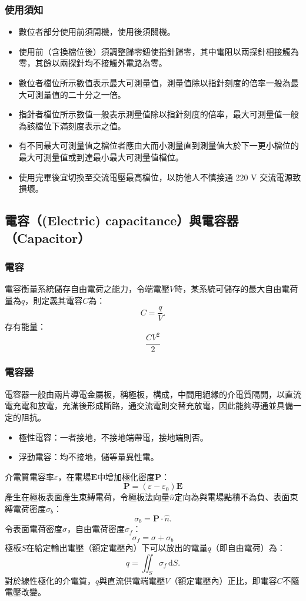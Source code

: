\documentclass[a4paper,12pt]{report}
\begin{document}
\begin{itemize}
\subsubsection{使用須知}
\begin{itemize}
\item 數位者部分使用前須開機，使用後須關機。
\item 使用前（含換檔位後）須調整歸零鈕使指針歸零，其中電阻以兩探針相接觸為零，其餘以兩探針均不接觸外電路為零。
\item 數位者檔位所示數值表示最大可測量值，測量值除以指針刻度的倍率一般為最大可測量值的二十分之一倍。
\item 指針者檔位所示數值一般表示測量值除以指針刻度的倍率，最大可測量值一般為該檔位下滿刻度表示之值。
\item 有不同最大可測量值之檔位者應由大而小測量直到測量值大於下一更小檔位的最大可測量值或到達最小最大可測量值檔位。
\item 使用完畢後宜切換至交流電壓最高檔位，以防他人不慎接通 220 V 交流電源致損壞。
\end{itemize}
\subsection{電容（(Electric) capacitance）與電容器（Capacitor）}
\subsubsection{電容}
電容衡量系統儲存自由電荷之能力，令端電壓$V$時，某系統可儲存的最大自由電荷量為$q$，則定義其電容$C$為：
\[C=\frac{q}{V}.\]
存有能量：
\[\frac{CV^2}{2}\]
\subsubsection{電容器}
電容器一般由兩片導電金屬板，稱極板，構成，中間用絕緣的介電質隔開，以直流電充電和放電，充滿後形成斷路，通交流電則交替充放電，因此能夠導通並具備一定的阻抗。
\begin{itemize}
\item 極性電容：一者接地，不接地端帶電，接地端則否。
\item 浮動電容：均不接地，儲等量異性電。
\end{itemize}
介電質電容率$\varepsilon$，在電場$\mathbf{E}$中增加極化密度$\mathbf{P}$：
\[\mathbf{P}=(\varepsilon-\varepsilon_0)\mathbf{E}\]
產生在極板表面產生束縛電荷，令極板法向量$\hat{n}$定向為與電場點積不為負、表面束縛電荷密度$\sigma_b$：
\[\sigma_b = \mathbf{P}\cdot\hat{n}.\]
令表面電荷密度$\sigma$，自由電荷密度$\sigma_f$：
\[\sigma_f=\sigma+\sigma_b\]
極板$S$在給定輸出電壓（額定電壓內）下可以放出的電量$q$（即自由電荷）為：
\[q=\iint_S\sigma_f\,\mathrm{d}S.\]
對於線性極化的介電質，$q$與直流供電端電壓$V$（額定電壓內）正比，即電容$C$不隨電壓改變。

\end{itemize}
\end{document}
